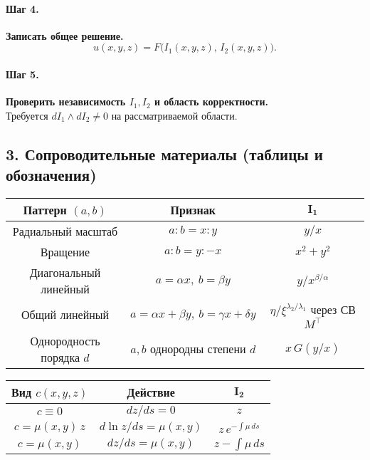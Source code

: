 \paragraph{Шаг 4.} \textbf{Записать общее решение.}\\
\[
u(x,y,z)=F\big(I_1(x,y,z),\,I_2(x,y,z)\big).
\]

\paragraph{Шаг 5.} \textbf{Проверить независимость \(I_1,I_2\) и область корректности.}\\
Требуется \(dI_1\wedge dI_2\neq0\) на рассматриваемой области.

\subsection*{3. Сопроводительные материалы (таблицы и обозначения)}

\begin{center}
\begin{tabular}{|c|c|c|}
\hline
\textbf{Паттерн \((a,b)\)} & \textbf{Признак} & \(\mathbf{I_1}\) \\
\hline
Радиальный масштаб & \(a:b=x:y\) & \(y/x\) \\
\hline
Вращение & \(a:b=y:-x\) & \(x^{2}+y^{2}\) \\
\hline
Диагональный линейный & \(a=\alpha x,\ b=\beta y\) & \(y/x^{\beta/\alpha}\) \\
\hline
Общий линейный & \(a=\alpha x+\beta y,\ b=\gamma x+\delta y\) & \(\eta/\xi^{\lambda_2/\lambda_1}\) через СВ \(M^\top\) \\
\hline
Однородность порядка \(d\) & \(a,b\) однородны степени \(d\) & \(x\,G(y/x)\) \\
\hline
\end{tabular}
\end{center}

\begin{center}
\begin{tabular}{|c|c|c|}
\hline
\textbf{Вид } \(c(x,y,z)\) & \textbf{Действие} & \(\mathbf{I_2}\) \\
\hline
\(c\equiv 0\) & \(dz/ds=0\) & \(z\) \\
\hline
\(c=\mu(x,y)\,z\) & \(d\ln z/ds=\mu(x,y)\) & \(z\,e^{-\int \mu\,ds}\) \\
\hline
\(c=\mu(x,y)\) & \(dz/ds=\mu(x,y)\) & \(z-\int \mu\,ds\) \\
\hline
\end{tabular}
\end{center}

